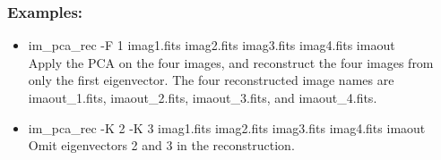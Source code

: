 \subsubsection{Examples:}
\begin{itemize}
\item  im\_pca\_rec -F 1 imag1.fits imag2.fits imag3.fits imag4.fits imaout\\
Apply the PCA on the four images, and reconstruct the four images from
only the first eigenvector. The four reconstructed image  names are
imaout\_1.fits, imaout\_2.fits, imaout\_3.fits, and imaout\_4.fits.
\item  im\_pca\_rec -K 2 -K 3 imag1.fits imag2.fits imag3.fits imag4.fits imaout \\
Omit eigenvectors 2 and 3 in the reconstruction.
\end{itemize}

